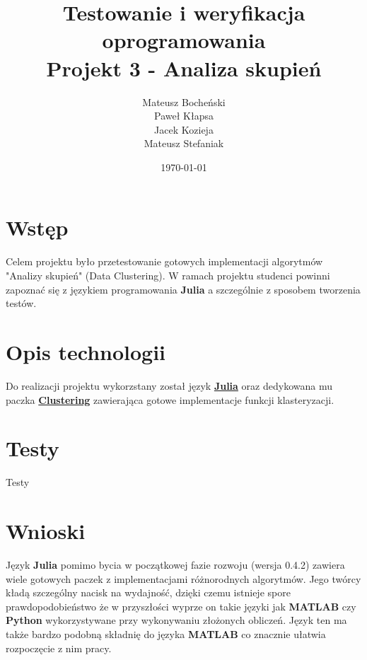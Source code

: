 \documentclass[a4paper,11pt,notitlepage]{article}
\author{Mateusz Bocheński\\Paweł Kłapsa\\Jacek Kozieja\\Mateusz Stefaniak}
\title{Testowanie i weryfikacja oprogramowania \\ {\small Projekt 3 - Analiza skupień}}
\date{\today}
\begin{document}
\maketitle
\tableofcontents

\section{Wstęp}
Celem projektu było przetestowanie gotowych implementacji algorytmów "Analizy skupień" (Data Clustering). W ramach projektu studenci powinni zapoznać się z językiem programowania \textbf{Julia} a szczególnie z sposobem tworzenia testów.


\section{Opis technologii}
Do realizacji projektu wykorzstany został język \href{http://julialang.org/}{\textbf{Julia}} oraz dedykowana mu paczka \href{http://clusteringjl.readthedocs.org/en/latest/index.html}{\textbf{Clustering}} zawierająca gotowe implementacje funkcji klasteryzacji.


\section{Testy}
Testy

\section{Wnioski}
Język \textbf{Julia} pomimo bycia w początkowej fazie rozwoju (wersja 0.4.2) zawiera wiele gotowych paczek z implementacjami różnorodnych algorytmów. Jego twórcy kładą szczególny nacisk na wydajność, dzięki czemu istnieje spore prawdopodobieństwo że w przyszłości wyprze on takie języki jak \textbf{MATLAB} czy \textbf{Python} wykorzystywane przy wykonywaniu złożonych obliczeń. Język ten ma także bardzo podobną składnię do języka \textbf{MATLAB} co znacznie ułatwia rozpoczęcie z nim pracy.
\end{document}
